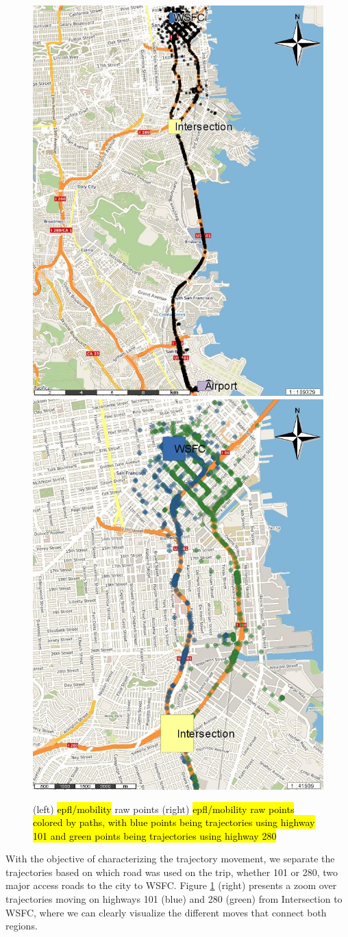 \documentclass[12pt]{article}
\begin{document}
\begin{figure}[ht!]
\centering
\includegraphics[width=.49\textwidth]{Images/CRAWDAD-Trajectories-Painted}
\includegraphics[width=.49\textwidth]{Images/CRAWDAD-Paths-Painted}
\caption{(left) \hl{epfl/mobility} raw points (right) \hl{epfl/mobility raw points colored by paths, with blue points being trajectories using highway 101 and green points being trajectories using highway 280}}
\label{fig:sanfrancisco_map_rois}
\end{figure}

With the objective of characterizing the trajectory movement, we separate the trajectories based on which road was used on the trip, whether 101 or 280, two major access roads to the city to WSFC. {Figure \ref{fig:sanfrancisco_map_rois}} (right) presents a zoom over trajectories moving on highways 101 (blue) and 280 (green) from Intersection to WSFC, where we can clearly visualize the different moves that connect both regions.
\end{document}
